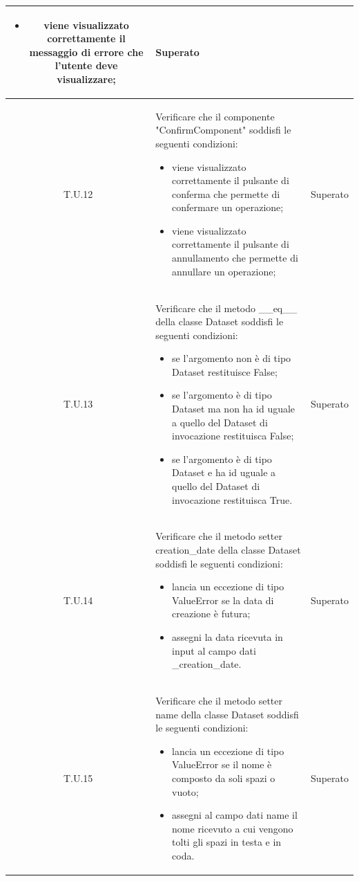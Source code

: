 \begin{tabularx}{\textwidth}{|c|X|c|}
\begin{itemize}
        \item viene visualizzato correttamente il messaggio di errore che l'utente deve visualizzare;
    \end{itemize}
    & Superato \\
    \hline
    \label{tu:tu37}T.U.12 & Verificare che il componente "ConfirmComponent" soddisfi le seguenti condizioni: 
    \begin{itemize}
        \item viene visualizzato correttamente il pulsante di conferma che permette di confermare un operazione;
        \item viene visualizzato correttamente il pulsante di annullamento che permette di annullare un operazione;
    \end{itemize}
    & Superato \\


    \hline
    \label{tu:tu38}T.U.13 & Verificare che il metodo \_\_eq\_\_ della classe Dataset soddisfi le seguenti condizioni: 
    \begin{itemize}
        \item se l'argomento non è di tipo Dataset restituisce False;
        \item se l'argomento è di tipo Dataset ma non ha id uguale a quello del Dataset di invocazione restituisca False;
        \item  se l'argomento è di tipo Dataset e ha id uguale a quello del Dataset di invocazione restituisca True.
    \end{itemize}
    & Superato \\
    \hline
    \label{tu:tu39}T.U.14 & Verificare che il metodo setter creation\_date della classe Dataset soddisfi le seguenti condizioni: 
    \begin{itemize}
        \item lancia un eccezione di tipo ValueError se la data di creazione è futura;
        \item assegni la data ricevuta in input al campo dati \_creation\_date.
    \end{itemize}
    & Superato \\
    \hline

    \label{tu:tu40}T.U.15 & Verificare che il metodo setter name della classe Dataset soddisfi le seguenti condizioni: 
    \begin{itemize}
          \item lancia un eccezione di tipo ValueError se il nome è composto da soli spazi o vuoto;
        \item assegni al campo dati name il nome ricevuto a cui vengono tolti gli spazi in testa e in coda.
    \end{itemize}
    & Superato \\


\end{tabularx}
